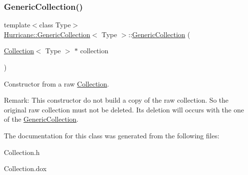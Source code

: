 \subsubsection{\texorpdfstring{Generic\+Collection()}{GenericCollection()}\hspace{0.1cm}{\footnotesize\ttfamily [3/3]}}
{\footnotesize\ttfamily template$<$class Type$>$ \\
\mbox{\hyperlink{classHurricane_1_1GenericCollection}{Hurricane\+::\+Generic\+Collection}}$<$ Type $>$\+::\mbox{\hyperlink{classHurricane_1_1GenericCollection}{Generic\+Collection}} (\begin{DoxyParamCaption}\item[{\mbox{\hyperlink{classHurricane_1_1Collection}{Collection}}$<$ Type $>$ $\ast$}]{collection }\end{DoxyParamCaption})\hspace{0.3cm}{\ttfamily [inline]}}

Constructor from a raw \mbox{\hyperlink{classHurricane_1_1Collection}{Collection}}.

\begin{DoxyParagraph}{Remark\+: This constructor do not build a copy of the raw collection. So the original}
raw collection must not be deleted. It\textquotesingle{}s deletion will occurs with the one of the \mbox{\hyperlink{classHurricane_1_1GenericCollection}{Generic\+Collection}}. 
\end{DoxyParagraph}


The documentation for this class was generated from the following files\+:\begin{DoxyCompactItemize}
\item 
Collection.\+h\item 
Collection.\+dox\end{DoxyCompactItemize}
